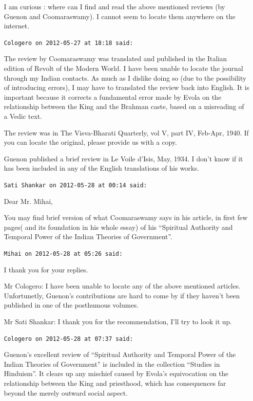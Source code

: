 \begin{footnotesize}
\begin{sffamily}
I am curious : where can I find and read the above mentioned reviews (by Guenon and Coomaraswamy). I cannot seem to locate them anywhere on the internet.

\hfill

\texttt{Cologero on 2012-05-27 at 18:18 said:}

The review by Coomaraswamy was translated and published in the Italian edition of Revolt of the Modern World. I have been unable to locate the journal through my Indian contacts. As much as I dislike doing so (due to the possibility of introducing errors), I may have to translated the review back into English. It is important because it corrects a fundamental error made by Evola on the relationship between the King and the Brahman caste, based on a misreading of a Vedic text.

The review was in The Visva-Bharati Quarterly, vol V, part IV, Feb-Apr, 1940. If you can locate the original, please provide us with a copy.

Guenon published a brief review in Le Voile d'Isis, May, 1934. I don't know if it has been included in any of the English translations of his works.

\hfill

\texttt{Sati Shankar on 2012-05-28 at 00:14 said:}

Dear Mr. Mihai,

You may find brief version of what Coomaraswamy says in his article, in first few pages( and its foundation in his whole essay) of his ``Spiritual Authority and Temporal Power of the Indian Theories of Government''.

\hfill

\texttt{Mihai on 2012-05-28 at 05:26 said:}

I thank you for your replies.

Mr Cologero: I have been unable to locate any of the above mentioned articles. Unfortunetly, Guenon's contributions are hard to come by if they haven't been published in one of the posthumous volumes.

Mr Sati Shankar: I thank you for the recommendation, I'll try to look it up.

\hfill

\texttt{Cologero on 2012-05-28 at 07:37 said:}

Guenon's excellent review of ``Spiritual Authority and Temporal Power of the Indian Theories of Government'' is included in the collection ``Studies in Hinduism''. It clears up any mischief caused by Evola's equivocation on the relationship between the King and priesthood, which has consequences far beyond the merely outward social aspect.


\end{sffamily}
\end{footnotesize}
